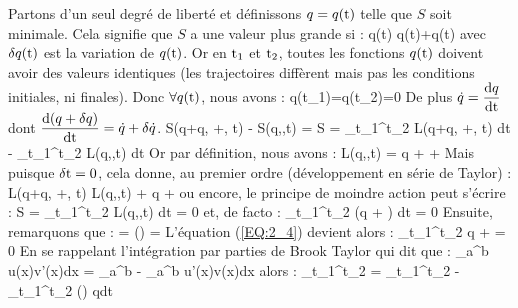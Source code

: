 Partons d'un seul degr\'e de libert\'e et d\'efinissons $q=q({\rm t})$ telle que $S$ soit minimale. Cela signifie que $S$ a une valeur plus grande si :
\be
	q({\rm t}) \rightarrow q({\rm t})+\delta q({\rm t}) \label{EQ:2_2}
\ee
avec $\delta q({\rm t})$ est la variation de $q({\rm t})$. Or en ${\rm t}_{1}$ et ${\rm t}_{2}$, toutes les fonctions $q({\rm t})$ doivent avoir des valeurs identiques (les trajectoires diff\`erent mais pas les conditions initiales, ni finales). Donc $\forall q({\rm t})$, nous avons :
\be
	\delta q({\rm t}_{1})=\delta q({\rm t}_{2})=0 \label{EQ:2_3}
\ee
De plus $\dot{q}=\dfrac{{\rm d}q}{\rm dt}$ dont $\dfrac{{\rm d}(q+\delta q)}{\rm dt}=\dot{q}+\delta\dot{q}$.
\be
	S(q+\delta q, +\delta {}, {\rm t}) - S(q,,{\rm t}) = \delta S = \int_{{\rm t}_{1}}^{{\rm t}_{2}} L(q+\delta q, +\delta {}, {\rm t}) d{\rm t} - \int_{{\rm t}_{1}}^{{\rm t}_{2}} L(q,,{\rm t}) d{\rm t}
\ee
Or par d\'efinition, nous avons :
\be
	\delta L(q,,{\rm t}) = \delta q + \delta {} + 
\ee
Mais puisque $\delta {\rm t}=0$, cela donne, au premier ordre (développement en s\'erie de Taylor) :
\be
	L(q+\delta q, +\delta {}, {\rm t}) \approx L(q,,{\rm t}) + \delta q + \delta {}
\ee
ou encore, le principe de moindre action peut s'\'ecrire :
\be
	\delta S = \delta \int_{{\rm t}_{1}}^{{\rm t}_{2}} L(q,,{\rm t}) d{\rm t} = 0 \label{EQ:2_4}
\ee
et, de facto :
\be
	\int_{{\rm t}_{1}}^{{\rm t}_{2}} \left(\delta q + \delta {}\right) {\rm dt} = 0
\ee
Ensuite, remarquons que :
\be
	\delta {} = \delta\left(\right) = 
\ee
L'\'equation (\ref{EQ:2_4}) devient alors :
\be
	\int_{{\rm t}_{1}}^{{\rm t}_{2}} \delta q +   = 0
\ee
En se rappelant l'intégration par parties de Brook Taylor qui dit que :
\be
	\int_{a}^{b} u(x)v'(x){\rm dx} = \left[u(x)v(x)\right]_{a}^{b} - \int_{a}^{b} u'(x)v(x){\rm dx}
\ee
alors :
\be
	\int_{{\rm t}_{1}}^{{\rm t}_{2}}   = _{{\rm t}_{1}}^{{\rm t}_{2}} - \int_{{\rm t}_{1}}^{{\rm t}_{2}} \left(\right) \delta q{\rm dt}
